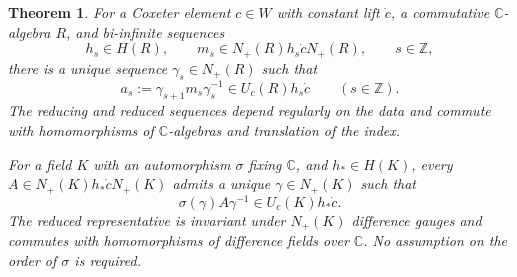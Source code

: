\documentclass[11pt,leqno]{amsart}
\numberwithin{equation}{section}
\theoremstyle{plain}
\newtheorem{theorem}{Theorem}[section]
\theoremstyle{definition}
\theoremstyle{plain}
\theoremstyle{definition}
\theoremstyle{remark}
\begin{document}
\begin{theorem}
\label{lem:weighted-Cartan-sequence}
\label{thm:difference-field-Steinberg}
For a Coxeter element $c\in W$ with constant lift $\dot c$, a commutative $\mathbb C$-algebra $R$, and bi-infinite sequences
\[
 h_s\in H(R),\qquad
 m_s\in N_+(R)h_s\dot cN_+(R),\qquad s\in\mathbb Z,
\]
there is a unique sequence $\gamma_s\in N_+(R)$ such that
\[
 a_s:=\gamma_{s+1}m_s\gamma_s^{-1}\in U_c(R)h_s\dot c
 \qquad(s\in\mathbb Z).
\]
The reducing and reduced sequences depend regularly on the data and commute with homomorphisms of $\mathbb C$-algebras and translation of the index.

For a field $K$ with an automorphism $\sigma$ fixing $\mathbb C$, and $h_*\in H(K)$, every $A\in N_+(K)h_*\dot cN_+(K)$ admits a unique $\gamma\in N_+(K)$ such that
\begin{equation}\label{eq:difference-field-Steinberg-representative}
 \sigma(\gamma)A\gamma^{-1}\in U_c(K)h_*\dot c.
\end{equation}
The reduced representative is invariant under $N_+(K)$ difference gauges and commutes with homomorphisms of difference fields over $\mathbb C$.  No assumption on the order of $\sigma$ is required.
\end{theorem}
\end{document}
